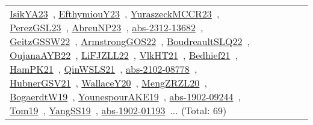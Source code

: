 {\begin{longtable}{lp{3cm}>{\raggedright\arraybackslash}p{6cm}>{\raggedright\arraybackslash}p{6cm}>{\raggedright\arraybackslash}p{8cm}}
\href{works/IsikYA23.pdf}{IsikYA23}~\cite{IsikYA23}, \href{works/EfthymiouY23.pdf}{EfthymiouY23}~\cite{EfthymiouY23}, \href{works/YuraszeckMCCR23.pdf}{YuraszeckMCCR23}~\cite{YuraszeckMCCR23}, \href{works/PerezGSL23.pdf}{PerezGSL23}~\cite{PerezGSL23}, \href{works/AbreuNP23.pdf}{AbreuNP23}~\cite{AbreuNP23}, \href{works/abs-2312-13682.pdf}{abs-2312-13682}~\cite{abs-2312-13682}, \href{works/GeitzGSSW22.pdf}{GeitzGSSW22}~\cite{GeitzGSSW22}, \href{works/ArmstrongGOS22.pdf}{ArmstrongGOS22}~\cite{ArmstrongGOS22}, \href{works/BoudreaultSLQ22.pdf}{BoudreaultSLQ22}~\cite{BoudreaultSLQ22}, \href{works/OujanaAYB22.pdf}{OujanaAYB22}~\cite{OujanaAYB22}, \href{works/LiFJZLL22.pdf}{LiFJZLL22}~\cite{LiFJZLL22}, \href{works/VlkHT21.pdf}{VlkHT21}~\cite{VlkHT21}, \href{works/Bedhief21.pdf}{Bedhief21}~\cite{Bedhief21}, \href{works/HamPK21.pdf}{HamPK21}~\cite{HamPK21}, \href{works/QinWSLS21.pdf}{QinWSLS21}~\cite{QinWSLS21}, \href{works/abs-2102-08778.pdf}{abs-2102-08778}~\cite{abs-2102-08778}, \href{works/HubnerGSV21.pdf}{HubnerGSV21}~\cite{HubnerGSV21}, \href{works/WallaceY20.pdf}{WallaceY20}~\cite{WallaceY20}, \href{works/MengZRZL20.pdf}{MengZRZL20}~\cite{MengZRZL20}, \href{works/BogaerdtW19.pdf}{BogaerdtW19}~\cite{BogaerdtW19}, \href{works/YounespourAKE19.pdf}{YounespourAKE19}~\cite{YounespourAKE19}, \href{works/abs-1902-09244.pdf}{abs-1902-09244}~\cite{abs-1902-09244}, \href{works/Tom19.pdf}{Tom19}~\cite{Tom19}, \href{works/YangSS19.pdf}{YangSS19}~\cite{YangSS19}, \href{works/abs-1902-01193.pdf}{abs-1902-01193}~\cite{abs-1902-01193}... (Total: 69)\\

\end{longtable}}
